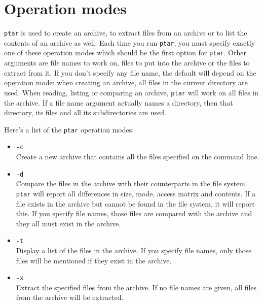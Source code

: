 \section{Operation modes}

{\tt ptar} is used to create an archive, to extract files from an archive or 
to list the contents of an archive as well. Each time you run {\tt ptar}, you 
must specify exactly one of these operation modes which should be the first
option for {\tt ptar}. Other arguments are file names to work on, files to put
into the archive or the files to extract from it. If you don't specify any 
file name, the default will depend on the operation mode: when creating an
archive, all files in the current directory are used. When reading, listing
or comparing an archive, {\tt ptar} will work on all files in the archive. If 
a file name argument actually names a directory, then that directory, its 
files and all its subdirectories are used.

Here's a list of the {\tt ptar} operation modes:

\begin{itemize}

  \item {\tt -c} \\
        Create a new archive that contains all the files specified on the 
        command line.

  \item {\tt -d} \\
        Compare the files in the archive with their counterparts in the file 
        system. {\tt ptar} will report all differences in size, mode, access 
        matrix and contents. If a file exists in the archive but cannot be 
        found in the file system, it will report this. If you specify file 
        names, those files are compared with the archive and they all must 
        exist in the archive.

  \item {\tt -t} \\
        Display a list of the files in the archive. If you specify file names, 
        only those files will be mentioned if they exist in the archive.

  \item {\tt -x} \\
        Extract the specified files from the archive. If no file names are 
        given, all files from the archive will be extracted.

\end{itemize}

